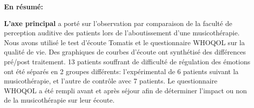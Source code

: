 


 
 
  





  
  \textbf{En résumé:} 
  
  \textbf{ L'axe principal}  a porté sur l'observation par comparaison de la faculté de 
  perception auditive 
  des patients lors de l'aboutissement d'une musicothérapie. Nous avons utilisé 
   le test d'écoute Tomatis et le questionnaire WHOQOL sur la qualité de vie.
  Des graphiques de courbes d'écoute ont synthétisé des différences pré/post traitement.
  13 patients souffrant de difficulté de régulation des émotions ont été séparés en 2 
  groupes différents: l'expérimental de 6 patients suivant la musicothérapie, et l'autre de
  contrôle avec 7 patients. Le questionnaire WHOQOL a été  rempli avant et 
  après séjour afin de déterminer l'impact ou non de la musicothérapie sur leur écoute.
  
